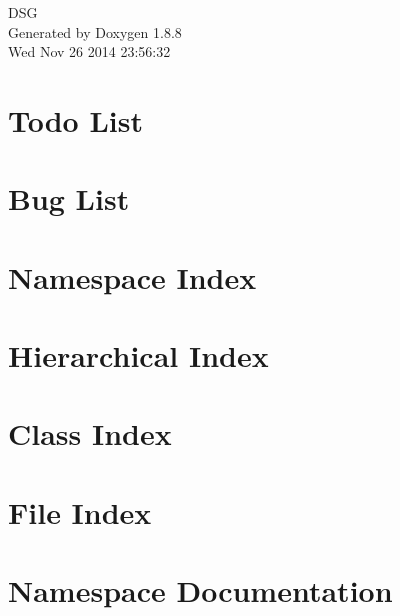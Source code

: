 \documentclass[twoside]{book}
\newcommand{\+}{\discretionary{\mbox{\scriptsize$\hookleftarrow$}}{}{}}
\newcommand{\clearemptydoublepage}{%
  \newpage{\pagestyle{empty}\cleardoublepage}%
}
\begin{document}
\hypersetup{pageanchor=false,
             bookmarks=true,
             bookmarksnumbered=true,
             pdfencoding=unicode
            }
\begin{titlepage}
\vspace*{7cm}
\begin{center}%
{\Large D\+S\+G }\\
\vspace*{1cm}
{\large Generated by Doxygen 1.8.8}\\
\vspace*{0.5cm}
{\small Wed Nov 26 2014 23:56:32}\\
\end{center}
\end{titlepage}
\clearemptydoublepage
\tableofcontents
\clearemptydoublepage
{}
\hypersetup{pageanchor=true}

\chapter{Todo List}
\label{todo}
\hypertarget{todo}{}

\chapter{Bug List}
\label{bug}
\hypertarget{bug}{}

\chapter{Namespace Index}

\chapter{Hierarchical Index}

\chapter{Class Index}

\chapter{File Index}

\chapter{Namespace Documentation}










\end{document}
